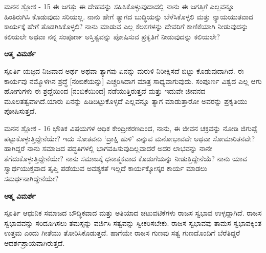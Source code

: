 \newpage
\begin{mananam}{\mananamfont ಮನನ ಶ್ಲೋಕ - \textenglish{15}}
\footnotesize \mananamtext ಈ ಜಗತ್ತು ಈ ದೇಹವನ್ನು ಸಹಿಸಿಕೊಳ್ಳುವುದಾದಲ್ಲಿ ನಾನು ಈ ಜಗತ್ತಿಗೆ ಎಲ್ಲವನ್ನೂ ಹಿಂತಿರುಗಿಸಿ ಕೊಡುವುದು ಸರಿಯಲ್ಲ. ನಾನು ಹೇಗೆ ತ್ಯಾಗದ ಬುದ್ಧಿಯನ್ನು ಬೆಳೆಸಿಕೊಳ್ಳಲಿ ಮತ್ತು ನ್ಯಾಯಯುತವಾದ ಕಾರ್ಯಕ್ಕೆ ಹೇಗೆ ತೊಡಗಿಸಿಕೊಳ್ಳಲಿ? ನಾನು ಮಾಡುವ ಎಲ್ಲ ಕೆಲಸಗಳನ್ನು ದೇವರಿಗೆ ಕಾಣಿಕೆಯಾಗಿ ನೀಡುವುದನ್ನು ಕಲಿಯಲೇ ಅಥವಾ ನನ್ನ ಸಂಪೂರ್ಣ ಅಸ್ತಿತ್ವವನ್ನು ಪೋಷಿಸುವ ಪ್ರಕೃತಿಗೆ ನೀಡುವುದನ್ನು ಕಲಿಯಲೇ?
\end{mananam}
\WritingHand\enspace\textbf{ಆತ್ಮ ವಿಮರ್ಶೆ}\\
\begin{inspiration}{\mananamfont ಸ್ಪೂರ್ತಿ}
\footnotesize \mananamtext ಯಜ್ಞದ ನಿಜವಾದ ಅರ್ಥ ಅಥವಾ ತ್ಯಾಗವು ಏನನ್ನು ಮರುಳಿ ನಿರೀಕ್ಷಿಸದೆ ಬಿಟ್ಟು ಕೊಡುವುದಾಗಿದೆ. ಈ ಕಾರ್ಯವು ನಮ್ಮೊಳಗಿನ ಶ್ರದ್ಧೆ [ನಂಬಿಕೆಯನ್ನು] ಎಚ್ಚರಿಸಿದಾಗ ಮಾತ್ರ ಸಾಧ್ಯವಾಗುವುದು. ಸಂಪೂರ್ಣ ವಿಶ್ವದ ಎಲ್ಲ ಆಗು ಹೋಗುಗಳು ಈ ಶ್ರದ್ದೆಯಿಂದ [ನಂಬಿಕೆಯಿಂದ] ನಡೆಯುತ್ತಿರುತ್ತದೆ ಮತ್ತು ಇದುವೇ ಜೀವನದ ಮೂಲತತ್ವವಾಗಿದೆ.ಯಾರು ಏನನ್ನು ಹಿಡಿದಿಟ್ಟುಕೊಳ್ಳದೆ ಎಲ್ಲವನ್ನೂ ತ್ಯಾಗ ಮಾಡುತ್ತಾರೋ ಅವರನ್ನು ಪ್ರಕೃತಿಯು ಪೋಷಿಸುತ್ತದೆ.
\end{inspiration}
\newpage

\begin{mananam}{\mananamfont ಮನನ ಶ್ಲೋಕ - \textenglish{16}}
\footnotesize \mananamtext
 ಭೌತಿಕ ವಿಷಯಗಳ ಅಧಿಕ ಕೇಂದ್ರೀಕರಣದಿಂದ, ನಾನು, ಈ ಜೀವನ ಚಕ್ರವನ್ನು ನೋಡಿ ಜಿಗುಪ್ಸೆ ಪಟ್ಟುಕೊಳ್ಳುತ್ತಿದ್ದೇನೆಯೇ? ಇದು ಸೋತವನು ‘ದ್ರಾಕ್ಷಿ ಹುಳಿ’ ಎನ್ನುವ ಮನೋಭಾವವೇ ಅಥವಾ ಸೋಮಾರಿತನವೇ?ಹಾಗಿದ್ದರೆ ನಾನು ಸಮಾಜದ ಪದ್ಧತಿಗಳಲ್ಲಿ ಭಾಗವಹಿಸುವುದಿಲ್ಲವಾದರೆ ಅದರ ಲಾಭವನ್ನು ನಾನೇ ತೆಗೆದುಕೊಳ್ಳುತ್ತಿದ್ದೇನೆಯೇ? ನಾನು ಸಮಾಜಕ್ಕೆ ಧನಾತ್ಮಕವಾದ ಕೊಡುಗೆಯನ್ನು ನೀಡುತ್ತಿದ್ದೇನೆಯೆ? ನಾನು ಯಾವ ಸ್ವಾರ್ಥಯುಕ್ತವಾದ ತೃಪ್ತಿ ಪಡೆಯುವ ಅವಶ್ಯಕತೆ ಇಲ್ಲದೆ ಕಾರ್ಯಕ್ಕೋಸ್ಕರ ಕಾರ್ಯ ಮಾಡಲು ಸಮರ್ಥನಾಗಿದ್ದೇನೆಯೇ?
\end{mananam}
\WritingHand\enspace\textbf{ಆತ್ಮ ವಿಮರ್ಶೆ}\\
\begin{inspiration}{\mananamfont ಸ್ಪೂರ್ತಿ}
\footnotesize \mananamtext ಆಧುನಿಕ ಸಮಾಜದ ಬೌದ್ಧಿಕವಾದ ಮತ್ತು ಅತಿಯಾದ ಚಟುವಟಿಕೆಗಳು ರಾಜಸ ಸ್ವಭಾವ ಉಳ್ಳದ್ದಾಗಿದೆ. ರಾಜಸ ಸ್ವಭಾವವನ್ನು ಸರಿದೂಗಿಸಲು ತಮಸ್ಸನ್ನು ವರ್ಜಿಸಿ ಸತ್ವವನ್ನು ಸ್ವೀಕರಿಸಬೇಕು. ರಾಜಸ ಸ್ವಭಾವವು ತಾಮಸ ಸ್ವಭಾವಕ್ಕಿಂತ ಉತ್ತಮ ಎಂದು ಗೀತೆಯು ತೋರಿಸಿಕೊಡುತ್ತದೆ. ಹಾಗೆಯೇ ರಾಜಸ ಗುಣವು ಸತ್ವ ಗುಣದೊಂದಿಗೆ ಬೆರೆತಿದ್ದರೆ ಆದರ್ಶಪ್ರಾಯವಾಗಿರುತ್ತದೆ.
\end{inspiration}
\newpage

